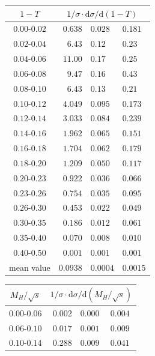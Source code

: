 \documentclass[12pt,a4paper,twoside]{article}
\begin{document}
\begin{table}[!htb]
\vspace*{-7mm}
\begin{center}
%
%
\begin{tabular}{|c||r@{ $\pm$ }l@{ $\pm$ }l|}   
\hline
$1-T$           & 
      \multicolumn{3}{c|}{$1/\sigma \cdot {\mathrm{d}}\sigma/{\mathrm{d}}(1-T)$} \\
\hline\hline
$ 0.00 $-$0.02  $&$  0.638 $&$  0.028 $&$  0.181 $\\
$ 0.02 $-$0.04  $&$  6.43  $&$  0.12  $&$  0.23  $\\
$ 0.04 $-$0.06  $&$ 11.00  $&$  0.17  $&$  0.25  $\\
$ 0.06 $-$0.08  $&$  9.47  $&$  0.16  $&$  0.43  $\\
$ 0.08 $-$0.10  $&$  6.43  $&$  0.13  $&$  0.21  $\\
$ 0.10 $-$0.12  $&$  4.049 $&$  0.095 $&$  0.173 $\\
$ 0.12 $-$0.14  $&$  3.033 $&$  0.084 $&$  0.239 $\\
$ 0.14 $-$0.16  $&$  1.962 $&$  0.065 $&$  0.151 $\\
$ 0.16 $-$0.18  $&$  1.704 $&$  0.062 $&$  0.179 $\\
$ 0.18 $-$0.20  $&$  1.209 $&$  0.050 $&$  0.117 $\\
$ 0.20 $-$0.23  $&$  0.922 $&$  0.036 $&$  0.066 $\\
$ 0.23 $-$0.26  $&$  0.754 $&$  0.035 $&$  0.095 $\\
$ 0.26 $-$0.30  $&$  0.453 $&$  0.022 $&$  0.049 $\\
$ 0.30 $-$0.35  $&$  0.186 $&$  0.012 $&$  0.061 $\\
$ 0.35 $-$0.40  $&$  0.070 $&$  0.008 $&$  0.010 $\\
$ 0.40 $-$0.50  $&$  0.001 $&$  0.001 $&$  0.001 $\\
\hline\hline
mean value       &$  0.0938 $&$ 0.0004 $&$ 0.0015 $\\
\hline
\end{tabular}
%
%
\begin{tabular}{|c||r@{ $\pm$ }l@{ $\pm$ }l|}   
\hline
$M_H/\sqrt{s}$           & 
      \multicolumn{3}{c|}{$1/\sigma \cdot {\mathrm{d}}
                            \sigma/{\mathrm{d}}(M_H/\sqrt{s})$} \\
\hline\hline
$ 0.00 $-$0.06  $&$  0.002 $&$  0.000 $&$  0.004 $\\
$ 0.06 $-$0.10  $&$  0.017 $&$  0.001 $&$  0.009 $\\
$ 0.10 $-$0.14  $&$  0.288 $&$  0.009 $&$  0.041 $\\

\end{tabular}
\end{center}
\end{table}
\end{document}
